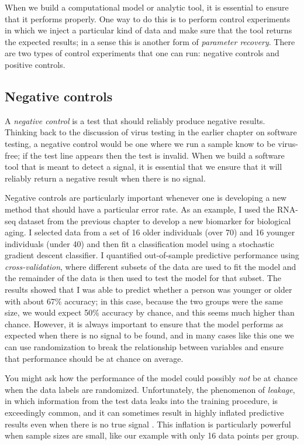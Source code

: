 When we build a computational model or analytic tool, it is essential to ensure that it performs properly.  One way to do this is to perform control experiments in which we inject a particular kind of data and make sure that the tool returns the expected results; in a sense this is another form of \textit{parameter recovery}.  There are two types of control experiments that one can run: negative controls and positive controls.

\subsection{Negative controls}

A \textit{negative control} is a test that should reliably produce negative results. Thinking back to the discussion of virus testing in the earlier chapter on software testing, a negative control would be one where we run a sample know to be virus-free; if the test line appears then the test is invalid.  When we build a software tool that is meant to detect a signal, it is essential that we ensure that it will reliably return a negative result when there is no signal.

Negative controls are particularly important whenever one is developing a new method that should have a particular error rate.  As an example, I used the RNA-seq dataset from the previous chapter to develop a new biomarker for biological aging. I selected data from a set of 16 older individuals (over 70) and 16 younger individuals (under 40) and then fit a classification model using a stochastic gradient descent classifier.  I quantified out-of-sample predictive performance using \textit{cross-validation}, where different subsets of the data are used to fit the model and the remainder of the data is then used to test the model for that subset.   The results showed that I was able to predict whether a person was younger or older with about 67\% accuracy; in this case, because the two groups were the same size, we would expect 50\% accuracy by chance, and this seems much higher than chance. However, it is always important to ensure that the model performs as expected when there is no signal to be found, and in many cases like this one we can use randomization to break the relationship between variables and ensure that performance should be at chance on average.

You might ask how the performance of the model could possibly \textit{not} be at chance when the data labels are randomized.  Unfortunately, the phenomenon of \textit{leakage}, in which information from the test data leaks into the training procedure, is exceedingly common, and it can sometimes result in highly inflated predictive results even when there is no true signal \citep{Kapoor:2023aa}. This inflation is particularly powerful when sample sizes are small, like our example with only 16 data points per group.

